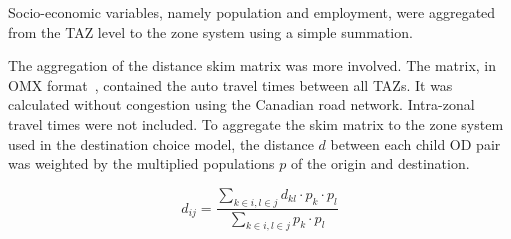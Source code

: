 Socio-economic variables, namely population and employment, were aggregated from the TAZ level to the zone system using a simple summation.

The aggregation of the distance skim matrix was more involved. The matrix, in OMX format~\parencite{omx}, contained the auto travel times between all TAZs. It was calculated without congestion using the Canadian road network. Intra-zonal travel times were not included. To aggregate the skim matrix to the zone system used in the destination choice model, the distance $d$ between each child OD pair was weighted by the multiplied populations $p$ of the origin and destination. 

$$ d_{ij} = 
\frac{
\sum_{k \in i, l \in j} d_{kl} \cdot p_k \cdot p_l}
{
\sum_{k \in i, l \in j} p_k \cdot p_l
} 
$$

